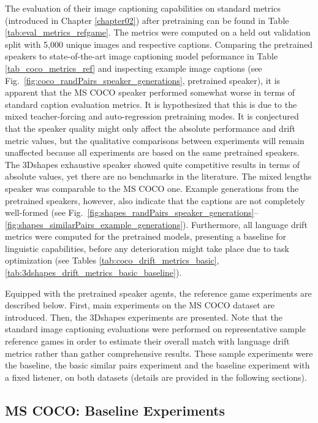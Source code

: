 The evaluation of their image captioning capabilities on standard metrics (introduced in Chapter \ref{chapter02}) after pretraining can be found in Table \ref{tab:eval_metrics_refgame}. The metrics were computed on a held out validation split with 5,000 unique images and respective captions. Comparing the pretrained speakers to state-of-the-art image captioning model peformance in Table \ref{tab_coco_metrics_ref} and inspecting example image captions (see Fig.~\ref{fig:coco_randPairs_speaker_generations}, pretrained speaker), it is apparent that the MS COCO speaker performed somewhat worse in terms of standard caption evaluation metrics. It is hypothesized that this is due to the mixed teacher-forcing and auto-regression pretraining modes. It is conjectured that the speaker quality might only affect the absolute performance and drift metric values, but the qualitative comparisons between experiments will remain unaffected because all experiments are based on the same pretrained speakers. The 3Dshapes exhaustive speaker showed quite competitive results in terms of absolute values, yet there are no benchmarks in the literature. The mixed lengths speaker was comparable to the MS COCO one. Example generations from the pretrained speakers, however, also indicate that the captions are not completely well-formed (see Fig.~\ref{fig:shapes_randPairs_speaker_generations}--\ref{fig:shapes_similarPairs_example_generations}).
Furthermore, all language drift metrics were computed for the pretrained models, presenting a baseline for linguistic capabilities, before any deterioration might take place due to task optimization (see Tables \ref{tab:coco_drift_metrics_basic}, \ref{tab:3dshapes_drift_metrics_basic_baseline}).

Equipped with the pretrained speaker agents, the reference game experiments are described below. First, main experiments on the MS COCO dataset are introduced. Then, the 3Dshapes experiments are presented. Note that the standard image captioning evaluations were performed on representative sample reference games in order to estimate their overall match with language drift metrics rather than gather comprehensive results. These sample experiments were the baseline, the basic similar pairs experiment and the baseline experiment with a fixed listener, on both datasets (details are provided in the following sections).

\subsection{MS COCO: Baseline Experiments}
\label{expt:coco_baseline}

